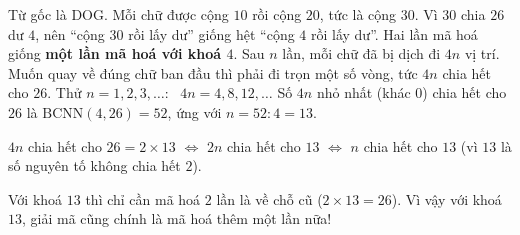 {Từ gốc là \textsf{DOG}.
Mỗi chữ được cộng $10$ rồi cộng $20$, tức là cộng $30$. Vì $30$ chia $26$ dư $4$, nên ``cộng $30$ rồi lấy dư'' giống hệt
``cộng $4$ rồi lấy dư''. Hai lần mã hoá giống \textbf{một lần mã hoá với khoá $4$}.
Sau $n$ lần, mỗi chữ đã bị dịch đi $4n$ vị trí. Muốn quay về đúng chữ ban đầu thì phải đi trọn một số vòng, tức $4n$ chia hết
cho $26$. Thử $n = 1, 2, 3, \dots$: \ $4n = 4, 8, 12, \dots$ Số $4n$ nhỏ nhất (khác $0$) chia hết cho $26$ là
$\text{BCNN}(4, 26) = 52$, ứng với $n = 52 : 4 = 13$.
\begin{recallbox}$4n$ chia hết cho $26 = 2\times 13$ $\Leftrightarrow$ $2n$ chia hết cho $13$ $\Leftrightarrow$ $n$ chia hết cho $13$
(vì $13$ là số nguyên tố không chia hết $2$).\end{recallbox}
\begin{tipbox}Với khoá $13$ thì chỉ cần mã hoá $2$ lần là về chỗ cũ ($2\times 13 = 26$). Vì vậy với khoá $13$,
giải mã cũng chính là mã hoá thêm một lần nữa!\end{tipbox}
}

